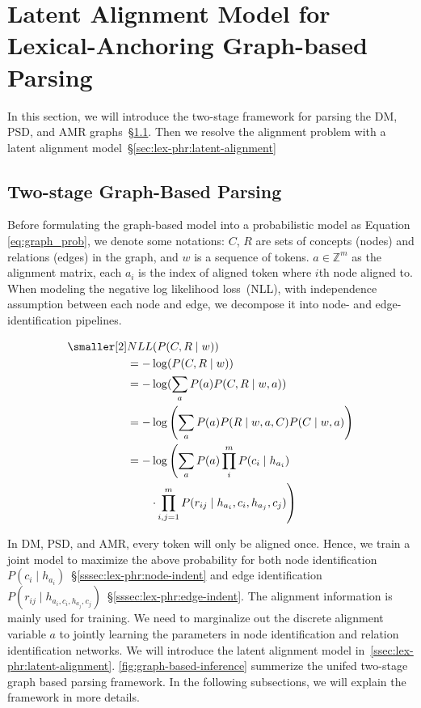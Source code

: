 \section{Latent Alignment Model for Lexical-Anchoring Graph-based Parsing}
\label{sec:lex-phr:graph-based}

In this section, we will introduce the two-stage framework for parsing
the DM, PSD, and AMR graphs~\S\ref{sec:lex-phr:two-stage}. Then we
resolve the alignment problem with a latent alignment model~\S\ref{sec:lex-phr:latent-alignment}

\subsection{Two-stage Graph-Based Parsing}
\label{sec:lex-phr:two-stage}

Before formulating the graph-based model into a probabilistic model as
Equation \ref{eq:graph_prob}, we denote some notations: $C$, $R$ are
sets of concepts (nodes) and relations (edges) in the graph, and $w$
is a sequence of tokens.  $a \in {\mathbb{Z}}^m$ as the alignment
matrix, each $a_{i}$ is the index of aligned token where $i$th node
aligned to. When modeling the negative log likelihood loss~(NLL), with
independence assumption between each node and edge, we decompose it
into node- and edge-identification pipelines.

\begin{equation}
  \label{eq:graph_prob}
\begin{aligned} \smaller[2]
 & NLL(P(C,R \mid w)) \\
 & = - \log(P(C,R \mid w)) \\
 & = - \log(\sum_{a}{P(a) P(C,R \mid w,a)}) \\
 & = - \log\left(\sum_{a}P(a) P(R\mid w,a,C) P(C \mid w, a)\right) \\
 & = - \log\left(\sum_{a}P(a) \prod_{i}^{m} P(c_{i} \mid h_{a_{i}}) \right. \\
 & \qquad \left.\cdot \prod_{i,j=1}^{m}P(r_{ij} \mid h_{a_{i}}, c_{i}, h_{a_{j}}, c_{j})\right)
\end{aligned}
\end{equation}

In DM, PSD, and AMR, every token will only be aligned once.  Hence, we
train a joint model to maximize the above probability for both node
identification
$P(c_{i} \mid h_{a_{i}})$~\S\ref{sssec:lex-phr:node-indent} and edge
identification
$P(r_{ij} \mid h_{{a_{i}}, c_{i},h_{a_{j}},
  c_{j}})$~\S\ref{sssec:lex-phr:edge-indent}. The alignment
information is mainly used for training. We need to marginalize out
the discrete alignment variable $a$ to jointly learning the parameters
in node identification and relation identification networks. We will
introduce the latent alignment model
in~\autoref{ssec:lex-phr:latent-alignment}. \autoref{fig:graph-based-inference}
summerize the unifed two-stage graph based parsing framework. In the
following subsections, we will explain the framework in more details.

